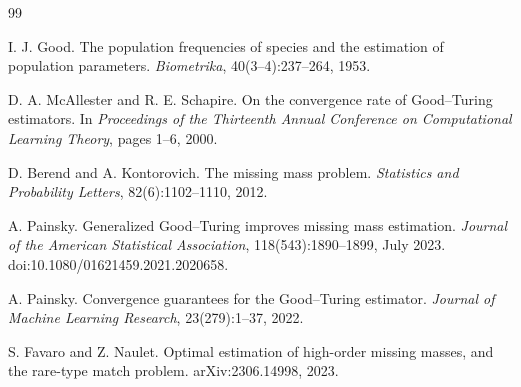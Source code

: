 \documentclass[11pt]{article}
\theoremstyle{definition}
\begin{document}
\begin{thebibliography}{99}

I. J. Good.
\newblock The population frequencies of species and the estimation of population parameters.
\newblock \emph{Biometrika}, 40(3--4):237--264, 1953.

D. A. McAllester and R. E. Schapire.
\newblock On the convergence rate of Good--Turing estimators.
\newblock In \emph{Proceedings of the Thirteenth Annual Conference on Computational Learning Theory}, pages 1--6, 2000.

D. Berend and A. Kontorovich.
\newblock The missing mass problem.
\newblock \emph{Statistics and Probability Letters}, 82(6):1102--1110, 2012.

A. Painsky.
\newblock Generalized Good--Turing improves missing mass estimation.
\newblock \emph{Journal of the American Statistical Association}, 118(543):1890--1899, July 2023.
\newblock doi:10.1080/01621459.2021.2020658.

A. Painsky.
\newblock Convergence guarantees for the Good--Turing estimator.
\newblock \emph{Journal of Machine Learning Research}, 23(279):1--37, 2022.

S. Favaro and Z. Naulet.
\newblock Optimal estimation of high-order missing masses, and the rare-type match problem.
\newblock arXiv:2306.14998, 2023.

\end{thebibliography}
\end{document}
